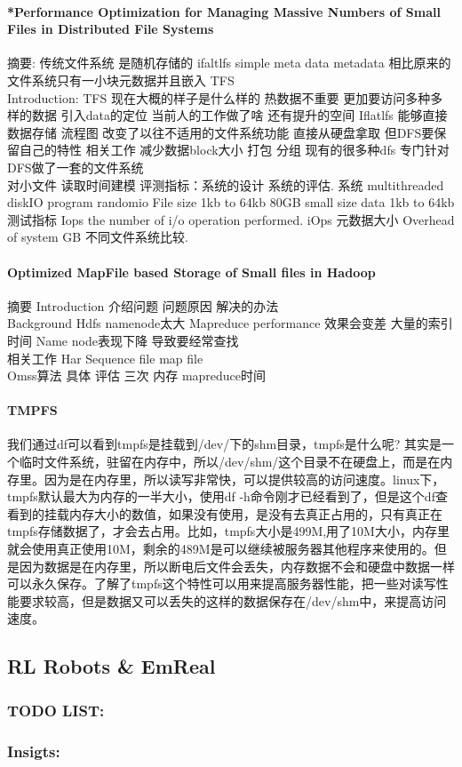 \documentclass[8pt,UTF8]{article}
\begin{document}
            \paragraph{*Performance Optimization for Managing Massive Numbers of Small Files in Distributed File Systems}
                摘要: 传统文件系统 是随机存储的 ifaltlfs simple meta data metadata 相比原来的文件系统只有一小块元数据并且嵌入 TFS \\
                Introduction: TFS 现在大概的样子是什么样的 热数据不重要 更加要访问多种多样的数据 引入data的定位 当前人的工作做了啥 还有提升的空间 Iflatlfs 能够直接数据存储 流程图
                改变了以往不适用的文件系统功能 直接从硬盘拿取  但DFS要保留自己的特性  相关工作  减少数据block大小 打包 分组 现有的很多种dfs 专门针对DFS做了一套的文件系统 \\
                对小文件 读取时间建模 评测指标：系统的设计 系统的评估. 系统 multithreaded diskIO program randomio File size 1kb to 64kb 80GB small size data 1kb to 64kb 测试指标 Iops the number of i/o operation performed. iOps 元数据大小 Overhead of system GB 不同文件系统比较.
            \paragraph{Optimized MapFile based Storage of Small files in Hadoop}
                摘要 Introduction  介绍问题 问题原因 解决的办法 \\
                Background Hdfs namenode太大 Mapreduce performance 效果会变差 大量的索引时间 Name node表现下降 导致要经常查找 \\
                相关工作 Har Sequence file map file \\
                Omss算法 具体 评估 三次 内存 mapreduce时间
            \paragraph{TMPFS}
                我们通过df可以看到tmpfs是挂载到/dev/下的shm目录，tmpfs是什么呢? 其实是一个临时文件系统，驻留在内存中，所以/dev/shm/这个目录不在硬盘上，而是在内存里。因为是在内存里，所以读写非常快，可以提供较高的访问速度。linux下，tmpfs默认最大为内存的一半大小，使用df -h命令刚才已经看到了，但是这个df查看到的挂载内存大小的数值，如果没有使用，是没有去真正占用的，只有真正在tmpfs存储数据了，才会去占用。比如，tmpfs大小是499M,用了10M大小，内存里就会使用真正使用10M，剩余的489M是可以继续被服务器其他程序来使用的。但是因为数据是在内存里，所以断电后文件会丢失，内存数据不会和硬盘中数据一样可以永久保存。了解了tmpfs这个特性可以用来提高服务器性能，把一些对读写性能要求较高，但是数据又可以丢失的这样的数据保存在/dev/shm中，来提高访问速度。
    
    \subsection{RL Robots \& EmReal}
        \subsubsection{TODO LIST:}
        \subsubsection{Insigts:}
        
    


\end{document}
